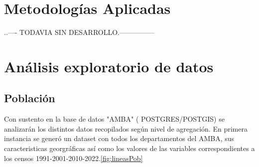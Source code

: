 \documentclass{article}
\theoremstyle{mytheoremstyle}
\theoremstyle{mytheoremstyle}
\theoremstyle{myproblemstyle}
\begin{document}
\section{Metodologías Aplicadas}

..---- TODAVIA SIN DESARROLLO.---------------


\section{ Análisis exploratorio de datos}
\subsection{Población}

Con sustento en la base de datos "AMBA" ( POSTGRES/POSTGIS) se analizarán los distintos datos recopilados según nivel de agregación.
En primera instancia se  generó un dataset con todos los departamentos del AMBA, sus caracteristicas georgráficas así como los valores
de las variables correspondientes a los censos 1991-2001-2010-2022.\ref{fig:lineasPob}
 
\end{document}
